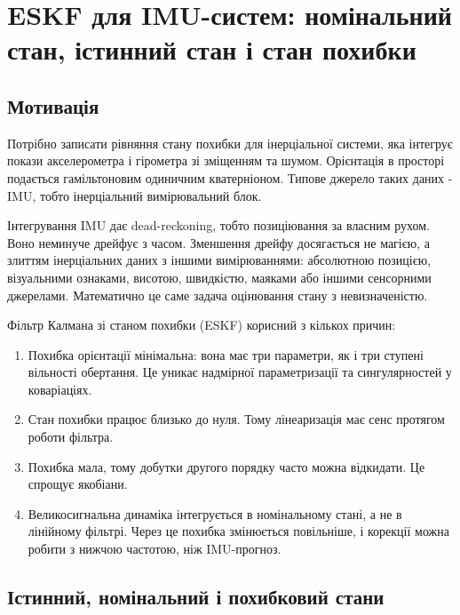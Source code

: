 \chapter{ESKF для IMU-систем: номінальний стан, істинний стан і стан похибки}


\section{Мотивація}

Потрібно записати рівняння стану похибки для інерціальної системи, яка інтегрує покази акселерометра і гірометра зі зміщенням та шумом. Орієнтація в просторі подається гамільтоновим одиничним кватерніоном. Типове джерело таких даних - IMU, тобто інерціальний вимірювальний блок.

Інтегрування IMU дає dead-reckoning, тобто позиціювання за власним рухом. Воно неминуче дрейфує з часом. Зменшення дрейфу досягається не магією, а злиттям інерціальних даних з іншими вимірюваннями: абсолютною позицією, візуальними ознаками, висотою, швидкістю, маяками або іншими сенсорними джерелами. Математично це саме задача оцінювання стану з невизначеністю.

Фільтр Калмана зі станом похибки (ESKF) корисний з кількох причин:
\begin{enumerate}[leftmargin=2em]
\item Похибка орієнтації мінімальна: вона має три параметри, як і три ступені вільності обертання. Це уникає надмірної параметризації та сингулярностей у коваріаціях.
\item Стан похибки працює близько до нуля. Тому лінеаризація має сенс протягом роботи фільтра.
\item Похибка мала, тому добутки другого порядку часто можна відкидати. Це спрощує якобіани.
\item Великосигнальна динаміка інтегрується в номінальному стані, а не в лінійному фільтрі. Через це похибка змінюється повільніше, і корекції можна робити з нижчою частотою, ніж IMU-прогноз.
\end{enumerate}

\section{Істинний, номінальний і похибковий стани}

